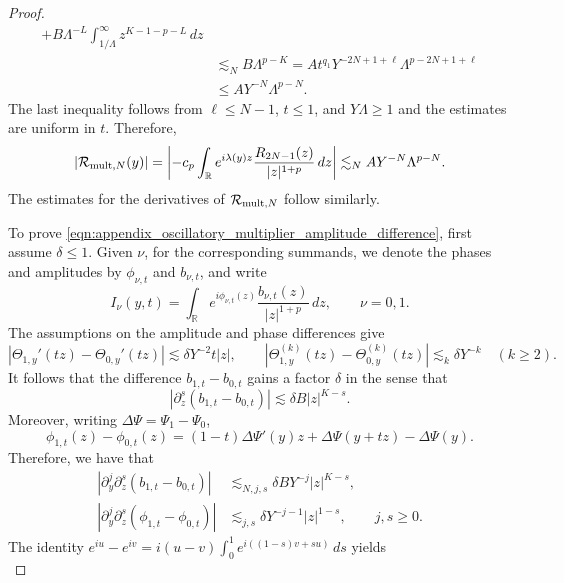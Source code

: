 \documentclass[11pt]{amsart}
\theoremstyle{definition}
\theoremstyle{remark}
\numberwithin{equation}{section}
\newcommand{\mc}[1]{\mathcal{#1}}
\begin{document}
\begin{proof}
\begin{equation}
\begin{aligned}
            +B\Lambda^{-L}\int_{1/\Lambda}^{\infty}z^{K-1-p-L}\,dz\\
            &\lesssim_N B\Lambda^{p-K}
            =At^{q_1}Y^{-2N+1+\ell}\Lambda^{p-2N+1+\ell}\\
            &\leq AY^{-N}\Lambda^{p-N}.
        \end{aligned}
    \end{equation}
    The last inequality follows from $\ell\leq N-1$, $t\leq1$, and $Y\Lambda\geq1$ and the estimates are uniform in $t$. Therefore,
    \[
        |\mc{R}_{\textup{mult},N}(y)|
        =\left|-c_p\int_{\mathbb R}e^{i\lambda(y)z}
        \frac{R_{2N-1}(z)}{|z|^{1+p}}\,dz\right|
        \lesssim_N AY^{-N}\Lambda^{p-N}.
    \]
    The estimates for the derivatives of $\mc{R}_{\textup{mult},N}$ follow similarly.

    To prove \eqref{eqn:appendix_oscillatory_multiplier_amplitude_difference}, first assume $\delta\leq1$.
    Given $\nu$, for the corresponding summands, we denote the phases and amplitudes by $\phi_{\nu,t}$ and $b_{\nu,t}$, and write
    \[
        I_\nu(y,t)=\int_{\mathbb R}e^{i\phi_{\nu,t}(z)}
        \frac{b_{\nu,t}(z)}{|z|^{1+p}}\,dz,\qquad \nu=0,1.
    \]
    The assumptions on the amplitude and phase differences give
    \[
        |\Theta_{1,y}'(tz)-\Theta_{0,y}'(tz)|\lesssim\delta Y^{-2}t|z|,
        \qquad
        |\Theta_{1,y}^{(k)}(tz)-\Theta_{0,y}^{(k)}(tz)|
        \lesssim_k\delta Y^{-k}\quad(k\geq2).
    \]
    It follows that the difference $b_{1,t}-b_{0,t}$ gains a factor $\delta$ in the sense that 
    \[|\partial_z^{s}(b_{1,t}-b_{0,t})|\lesssim\delta B|z|^{K-s}.\]
    Moreover, writing $\Delta\Psi=\Psi_1-\Psi_0$,
    \[
        \phi_{1,t}(z)-\phi_{0,t}(z)
        =(1-t)\Delta\Psi'(y)z+\Delta\Psi(y+tz)-\Delta\Psi(y).
    \]
    Therefore, we have that
    \begin{equation}\label{eqn:appendix_oscillatory_multiplier_difference_symbols}
        \begin{aligned}
            |\partial_y^j\partial_z^s(b_{1,t}-b_{0,t})|
            &\lesssim_{N,j,s}\delta BY^{-j}|z|^{K-s},\\
            |\partial_y^j\partial_z^s(\phi_{1,t}-\phi_{0,t})|
            &\lesssim_{j,s}\delta Y^{-j-1}|z|^{1-s},
            \qquad j,s\geq0.
        \end{aligned}
    \end{equation}
    The identity $e^{iu}-e^{iv}=i(u-v)\int_0^1e^{i((1-s)v+su)}\,ds$ yields
    \begin{equation}\label{eqn:appendix_oscillatory_multiplier_difference_integrals}

\end{equation}
\end{proof}
\end{document}
